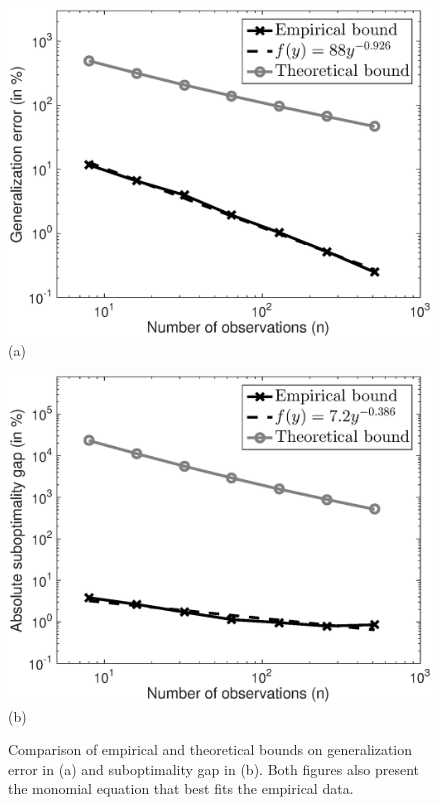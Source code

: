 \documentclass[]{interact}
\theoremstyle{plain}%
\theoremstyle{definition}
\theoremstyle{remark}
\newcommand{\0}{\V{0}}
\newcommand{\1}{\V{1}}
\theoremstyle{plain}
\theoremstyle{definition}
\begin{document}
\begin{figure}[h]
\begin{minipage}[t]{0.45\linewidth}
	\centering
	\includegraphics[width=\linewidth]{genError.eps}
	\mbox{(a)}
\end{minipage}
\hfill
\begin{minipage}[t]{0.45\linewidth}
	\centering
	\includegraphics[width=\linewidth]{suboptError.eps}
	\mbox{(b)}
\end{minipage}%
\caption{Comparison of empirical and theoretical bounds on generalization error in (a) and suboptimality gap in (b). Both figures also present the monomial equation that best fits the empirical data.}
\label{fig:generalizationError}
\end{figure}
\end{document}

